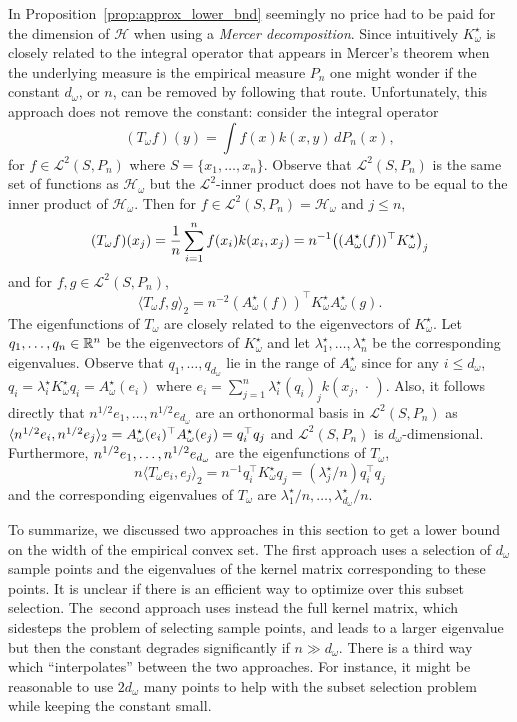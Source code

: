 \documentclass[AHL,Unicode,longabstracts,published]{cedram}
\theoremstyle{remark}
\newcommand{\R}{\mathbb{R}}
\newcommand{\cH}{\mathcal{H}}
\newcommand{\clL}{\mathcal{L}}
\let\originalleft\left
\let\originalright\right
\renewcommand{\left}{\mathopen{}\mathclose\bgroup\originalleft}
\renewcommand{\right}{\aftergroup\egroup\originalright}
\newcounter{setofstep}
\newcounter{step}[setofstep]
\begin{document}
In Proposition~\ref{prop:approx_lower_bnd} seemingly no price had to be paid for the dimension of $\cH$ when using a \emph{Mercer decomposition}. Since intuitively $K^\star_\omega$ is closely related to the integral operator that appears in Mercer's theorem when the underlying measure is the empirical measure $P_n$ one might wonder if the constant $d_\omega$, or $n$, can be removed by following that route. Unfortunately, this approach does not remove the constant: consider the integral operator
\[
(T_\omega f)(y) = \int f(x) k(x,y) \,dP_n(x),
\]
for $f \in \clL^2(S, P_n)$ where $S = \{x_1,\dots,x_n\}$. Observe that $\clL^2(S,P_n)$ is the same set of functions as $\cH_\omega$ but the $\clL^2$-inner product does not have to be equal to the inner product of $\cH_\omega$. Then for $f\in \clL^2(S,P_n) = \cH_\omega$ and $j\leq n$,
\[
(T_\omega f)(x_j) = \frac{1}{n} \sum_{i=1}^n f(x_i) k(x_i,x_j) = n^{-1} \left((A_\omega^\star(f))^\top K_\omega^\star\right)_j
\]
and for $f,g \in \clL^2(S,P_n)$,
\[
\langle T_\omega f,g \rangle_2 = n^{-2} (A_\omega^\star(f))^\top K_\omega^\star A_\omega^\star(g).
\]
The eigenfunctions of $T_\omega$ are closely related to the eigenvectors of $K_\omega^\star$. Let $q_1,\dots,\linebreak q_n \in \R^n$ be the eigenvectors of $K_\omega^\star$ and let $\lambda^\star_1,\dots, \lambda^\star_n$ be the corresponding eigenvalues. Observe that $q_1,\dots, q_{d_\omega}$ lie in the range of $A^\star_\omega$ since for any $i\leq d_\omega$, $q_i= \lambda^\star_i K_\omega^\star q_i = A_\omega^\star(e_i)$ where $e_i = \sum_{j=1}^n \lambda^\star_i (q_i)_j k(x_j,\,\cdot\,)$. Also, it follows directly that $n^{1/2} e_1,\dots,n^{1/2} e_{d_\omega}$ are an orthonormal basis in $\clL^2(S,P_n)$ as $\langle n^{1/2} e_i, n^{1/2} e_j\rangle_2 =\linebreak A_\omega^\star(e_i)^\top A_\omega^\star(e_j) = q_i^\top q_j$ and $\clL^2(S,P_n)$ is $d_\omega$-dimensional. Furthermore, $n^{1/2} e_1,\dots,\linebreak n^{1/2} e_{d_\omega}$ are the eigenfunctions of $T_\omega$,
\[
n \langle T_\omega e_i, e_j \rangle_2 = n^{-1} q_i^\top K_\omega^\star q_j = (\lambda_j^\star/n) q_i^\top q_j
\]
and the corresponding eigenvalues of $T_\omega$ are $\lambda^\star_1/n, \dots, \lambda_{d_\omega}^\star/n$.



To summarize, we discussed two approaches in this section to get a lower bound on the width of the empirical convex set. The first approach uses a selection of $d_\omega$ sample points and the eigenvalues of the kernel matrix corresponding to these points. It is unclear if there is an efficient way to optimize over this subset selection. The~second approach uses instead the full kernel matrix, which sidesteps the problem of selecting sample points, and leads to a larger eigenvalue but then the constant degrades significantly if $n \gg d_\omega$. There is a third way which ``interpolates'' between the two approaches. For instance, it might be reasonable to use $2 d_\omega$ many points to help with the subset selection problem while keeping the constant small.
\end{document}
